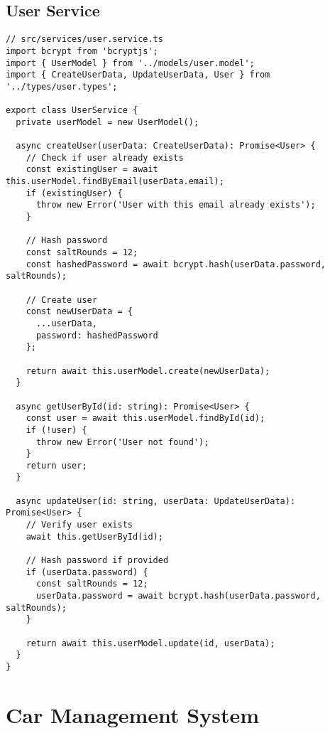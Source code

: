 \documentclass[12pt,a4paper]{article}
\begin{document}
\subsection{User Service}
\begin{lstlisting}[caption=User Business Logic Service]
// src/services/user.service.ts
import bcrypt from 'bcryptjs';
import { UserModel } from '../models/user.model';
import { CreateUserData, UpdateUserData, User } from '../types/user.types';

export class UserService {
  private userModel = new UserModel();

  async createUser(userData: CreateUserData): Promise<User> {
    // Check if user already exists
    const existingUser = await this.userModel.findByEmail(userData.email);
    if (existingUser) {
      throw new Error('User with this email already exists');
    }

    // Hash password
    const saltRounds = 12;
    const hashedPassword = await bcrypt.hash(userData.password, saltRounds);

    // Create user
    const newUserData = {
      ...userData,
      password: hashedPassword
    };

    return await this.userModel.create(newUserData);
  }

  async getUserById(id: string): Promise<User> {
    const user = await this.userModel.findById(id);
    if (!user) {
      throw new Error('User not found');
    }
    return user;
  }

  async updateUser(id: string, userData: UpdateUserData): Promise<User> {
    // Verify user exists
    await this.getUserById(id);

    // Hash password if provided
    if (userData.password) {
      const saltRounds = 12;
      userData.password = await bcrypt.hash(userData.password, saltRounds);
    }

    return await this.userModel.update(id, userData);
  }
}
\end{lstlisting}

\section{Car Management System}
\end{document}
